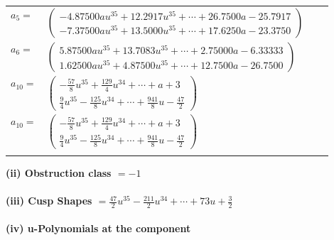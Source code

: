 \documentclass[1p]{elsarticle_modified}
\theoremstyle{definition}
\begin{document}
\begin{tabular}{m{7pt} m{180pt} m{7pt} m{180pt} }
\flushright $a_{5}=$&$\begin{pmatrix}-4.87500 a u^{35}+12.2917 u^{35}+\cdots+26.7500 a-25.7917\\-7.37500 a u^{35}+13.5000 u^{35}+\cdots+17.6250 a-23.3750\end{pmatrix}$ \\
\flushright $a_{6}=$&$\begin{pmatrix}5.87500 a u^{35}+13.7083 u^{35}+\cdots+2.75000 a-6.33333\\1.62500 a u^{35}+4.87500 u^{35}+\cdots+12.7500 a-26.7500\end{pmatrix}$ \\
\flushright $a_{10}=$&$\begin{pmatrix}-\frac{57}{8} u^{35}+\frac{129}{4} u^{34}+\cdots+a+3\\\frac{9}{4} u^{35}-\frac{125}{8} u^{34}+\cdots+\frac{941}{8} u-\frac{47}{2}\end{pmatrix}$\\ \flushright $a_{10}=$&$\begin{pmatrix}-\frac{57}{8} u^{35}+\frac{129}{4} u^{34}+\cdots+a+3\\\frac{9}{4} u^{35}-\frac{125}{8} u^{34}+\cdots+\frac{941}{8} u-\frac{47}{2}\end{pmatrix}$\\&\end{tabular}
\flushleft \textbf{(ii) Obstruction class $= -1$}\\~\\
\flushleft \textbf{(iii) Cusp Shapes $= \frac{47}{2} u^{35}-\frac{211}{2} u^{34}+\cdots+73 u+\frac{3}{2}$}\\~\\
\newpage\renewcommand{\arraystretch}{1}
\flushleft \textbf{(iv) u-Polynomials at the component}\newline \\
\end{document}

